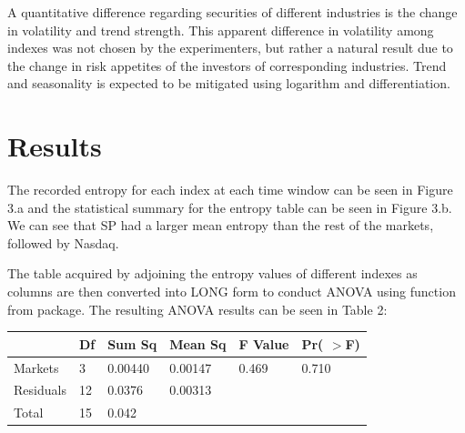 \documentclass{article}[12pt]
\begin{document}
                A quantitative difference regarding securities of different industries is the change in volatility and trend strength. This apparent difference in volatility among indexes was not chosen by the experimenters, but rather a natural result due to the change in risk appetites of the investors of corresponding industries. Trend and seasonality is expected to be mitigated using logarithm and differentiation.

        \section{Results}
                The recorded entropy for each index at each time window can be seen in Figure 3.a and the statistical summary for the entropy table can be seen in Figure 3.b. We can see that SP had a larger mean entropy than the rest of the markets, followed by Nasdaq.

                \begin{figure}[htbp]
                    \centering
                    \hfill
                    \caption{}
                  \end{figure}

                The table acquired by adjoining the entropy values of different indexes as columns are then converted into LONG form to conduct ANOVA using  function from  package. The resulting ANOVA results can be seen in Table 2:

                  \begin{center}
                    \begin{tabular}{ |p{2cm}|p{1cm}|p{2cm}|p{2cm}|p{2cm}|p{2cm}|}
                        \hline
                                   & Df &Sum Sq  &Mean Sq  &F Value &Pr( $>$F)\\
                        \hline
                        Markets    &3   &0.00440 &0.00147  &0.469   &0.710  \\
                        Residuals  &12  &0.0376  &0.00313  &        &  \\
                        Total      &15  &0.042  &  &        &  \\
                        \hline
                    \end{tabular}
                \end{center}
\end{document}
